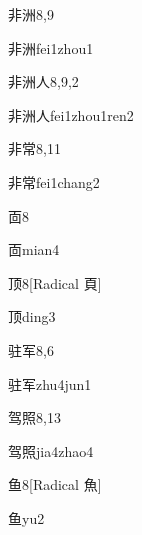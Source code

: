 \begin{entry}{非洲}{8,9}
  \begin{phonetics}{非洲}{fei1zhou1}
  \end{phonetics}
\end{entry}

\begin{entry}{非洲人}{8,9,2}
  \begin{phonetics}{非洲人}{fei1zhou1ren2}
  \end{phonetics}
\end{entry}

\begin{entry}{非常}{8,11}
  \begin{phonetics}{非常}{fei1chang2}
  \end{phonetics}
\end{entry}

\begin{entry}{靣}{8}
  \begin{phonetics}{靣}{mian4}
  \end{phonetics}
\end{entry}

\begin{entry}{顶}{8}[Radical 頁]
  \begin{phonetics}{顶}{ding3}
  \end{phonetics}
\end{entry}

\begin{entry}{驻军}{8,6}
  \begin{phonetics}{驻军}{zhu4jun1}
  \end{phonetics}
\end{entry}

\begin{entry}{驾照}{8,13}
  \begin{phonetics}{驾照}{jia4zhao4}
  \end{phonetics}
\end{entry}

\begin{entry}{鱼}{8}[Radical 魚]
  \begin{phonetics}{鱼}{yu2}
  \end{phonetics}
\end{entry}


